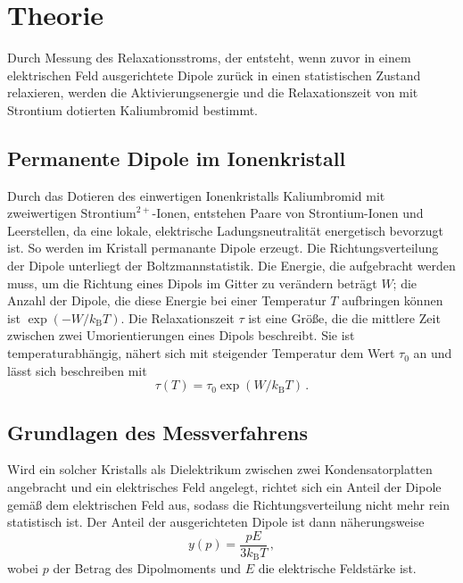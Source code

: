 \section{Theorie}

Durch Messung des Relaxationsstroms, der entsteht, wenn zuvor in einem elektrischen Feld ausgerichtete Dipole zurück in einen statistischen Zustand relaxieren, werden die Aktivierungsenergie und die Relaxationszeit von mit Strontium dotierten Kaliumbromid bestimmt.

\subsection{Permanente Dipole im Ionenkristall}

Durch das Dotieren des einwertigen Ionenkristalls Kaliumbromid mit zweiwertigen $\text{Strontium}^{2+}$-Ionen, entstehen Paare von Strontium-Ionen und Leerstellen, da eine lokale, elektrische Ladungsneutralität energetisch bevorzugt ist. So werden im Kristall permanante Dipole erzeugt. Die Richtungsverteilung der Dipole unterliegt der Boltzmannstatistik. Die Energie, die aufgebracht werden muss, um die Richtung eines Dipols im Gitter zu verändern beträgt $W$; die Anzahl der Dipole, die diese Energie bei einer Temperatur $T$ aufbringen können ist $\exp \left( -W/k_\text{B}T \right)$. Die Relaxationszeit $\tau$ ist eine Größe, die die mittlere Zeit zwischen zwei Umorientierungen eines Dipols beschreibt. Sie ist temperaturabhängig, nähert sich mit steigender Temperatur dem Wert $\tau_0$ an und lässt sich beschreiben mit
\begin{equation}
  \tau(T) = \tau_0 \exp \left( W/k_\text{B}T \right)\,.
\end{equation}

\subsection{Grundlagen des Messverfahrens}

Wird ein solcher Kristalls als Dielektrikum zwischen zwei Kondensatorplatten angebracht und ein elektrisches Feld angelegt, richtet sich ein Anteil der Dipole gemäß dem elektrischen Feld aus, sodass die Richtungsverteilung nicht mehr rein statistisch ist. Der Anteil der ausgerichteten Dipole ist dann näherungsweise
\begin{equation}
  y(p) = \frac{pE}{3k_\text{B}T}\,,
\end{equation}
wobei $p$ der Betrag des Dipolmoments und $E$ die elektrische Feldstärke ist.
